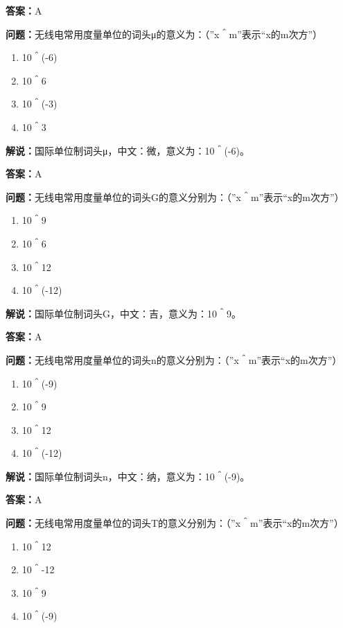 \documentclass[UTF8]{ctexbook}
\begin{document}
\textbf{答案：}A

\textbf{问题：}无线电常用度量单位的词头μ的意义为：（”x＾m”表示“x的m次方”）

\begin{enumerate}[label=\Alph*), leftmargin=3em]
  \item 10＾(-6)
  \item 10＾6
  \item 10＾(-3)
  \item 10＾3
\end{enumerate}

\textbf{解说：}国际单位制词头μ，中文：微，意义为：10＾(-6)。

\textbf{答案：}A

\textbf{问题：}无线电常用度量单位的词头G的意义分别为：（”x＾m”表示“x的m次方”）

\begin{enumerate}[label=\Alph*), leftmargin=3em]
  \item 10＾9
  \item 10＾6
  \item 10＾12
  \item 10＾(-12)
\end{enumerate}

\textbf{解说：}国际单位制词头G，中文：吉，意义为：10＾9。

\textbf{答案：}A

\textbf{问题：}无线电常用度量单位的词头n的意义分别为：（”x＾m”表示“x的m次方”）

\begin{enumerate}[label=\Alph*), leftmargin=3em]
  \item 10＾(-9)
  \item 10＾9
  \item 10＾12
  \item 10＾(-12)
\end{enumerate}

\textbf{解说：}国际单位制词头n，中文：纳，意义为：10＾(-9)。

\textbf{答案：}A

\textbf{问题：}无线电常用度量单位的词头T的意义分别为：（”x＾m”表示“x的m次方”）

\begin{enumerate}[label=\Alph*), leftmargin=3em]
  \item 10＾12
  \item 10＾-12
  \item 10＾9
  \item 10＾(-9)
\end{enumerate}
\end{document}
